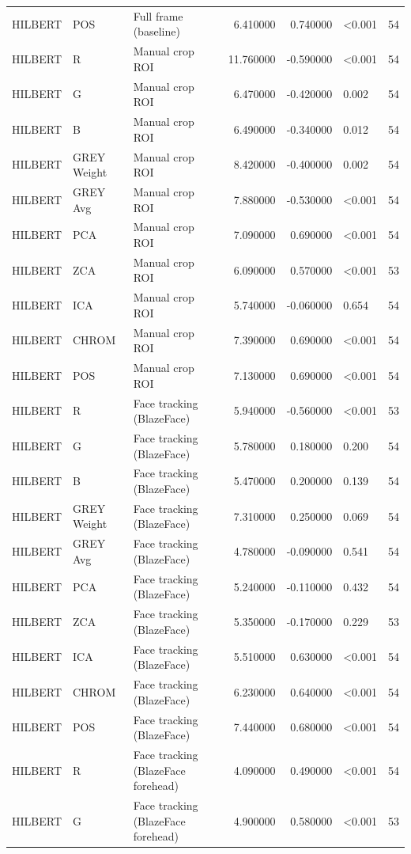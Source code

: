 \begin{table}[htbp]
\begin{tabular}{l l l r r l r}
HILBERT & POS & Full frame (baseline) & 6.410000 & 0.740000 & <0.001 & 54 \\
HILBERT & R & Manual crop ROI & 11.760000 & -0.590000 & <0.001 & 54 \\
HILBERT & G & Manual crop ROI & 6.470000 & -0.420000 & 0.002 & 54 \\
HILBERT & B & Manual crop ROI & 6.490000 & -0.340000 & 0.012 & 54 \\
HILBERT & GREY Weight & Manual crop ROI & 8.420000 & -0.400000 & 0.002 & 54 \\
HILBERT & GREY Avg & Manual crop ROI & 7.880000 & -0.530000 & <0.001 & 54 \\
HILBERT & PCA & Manual crop ROI & 7.090000 & 0.690000 & <0.001 & 54 \\
HILBERT & ZCA & Manual crop ROI & 6.090000 & 0.570000 & <0.001 & 53 \\
HILBERT & ICA & Manual crop ROI & 5.740000 & -0.060000 & 0.654 & 54 \\
HILBERT & CHROM & Manual crop ROI & 7.390000 & 0.690000 & <0.001 & 54 \\
HILBERT & POS & Manual crop ROI & 7.130000 & 0.690000 & <0.001 & 54 \\
HILBERT & R & Face tracking (BlazeFace) & 5.940000 & -0.560000 & <0.001 & 53 \\
HILBERT & G & Face tracking (BlazeFace) & 5.780000 & 0.180000 & 0.200 & 54 \\
HILBERT & B & Face tracking (BlazeFace) & 5.470000 & 0.200000 & 0.139 & 54 \\
HILBERT & GREY Weight & Face tracking (BlazeFace) & 7.310000 & 0.250000 & 0.069 & 54 \\
HILBERT & GREY Avg & Face tracking (BlazeFace) & 4.780000 & -0.090000 & 0.541 & 54 \\
HILBERT & PCA & Face tracking (BlazeFace) & 5.240000 & -0.110000 & 0.432 & 54 \\
HILBERT & ZCA & Face tracking (BlazeFace) & 5.350000 & -0.170000 & 0.229 & 53 \\
HILBERT & ICA & Face tracking (BlazeFace) & 5.510000 & 0.630000 & <0.001 & 54 \\
HILBERT & CHROM & Face tracking (BlazeFace) & 6.230000 & 0.640000 & <0.001 & 54 \\
HILBERT & POS & Face tracking (BlazeFace) & 7.440000 & 0.680000 & <0.001 & 54 \\
HILBERT & R & Face tracking (BlazeFace forehead) & 4.090000 & 0.490000 & <0.001 & 54 \\
HILBERT & G & Face tracking (BlazeFace forehead) & 4.900000 & 0.580000 & <0.001 & 53 \\

\end{tabular}
\end{table}
